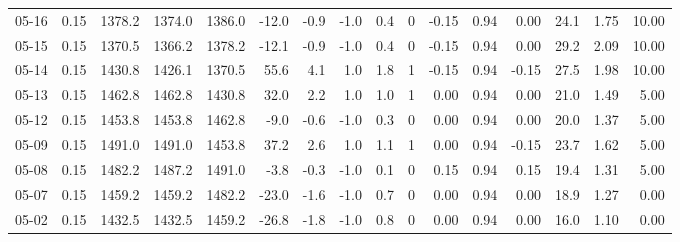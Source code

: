 \begin{threeparttable}
{\begin{tabular}{lrrrrrrrrrrrrrrr}
  05-16 &     0.15 & 1378.2 & 1374.0 & 1386.0 &      -12.0 &           -0.9 &                     -1.0 &                 0.4 &              0 &      -0.15 &      0.94 &           0.00 &             24.1 &            1.75 &                  10.00 \\
  05-15 &     0.15 & 1370.5 & 1366.2 & 1378.2 &      -12.1 &           -0.9 &                     -1.0 &                 0.4 &              0 &      -0.15 &      0.94 &           0.00 &             29.2 &            2.09 &                  10.00 \\
  05-14 &     0.15 & 1430.8 & 1426.1 & 1370.5 &       55.6 &            4.1 &                      1.0 &                 1.8 &              1 &      -0.15 &      0.94 &          -0.15 &             27.5 &            1.98 &                  10.00 \\
  05-13 &     0.15 & 1462.8 & 1462.8 & 1430.8 &       32.0 &            2.2 &                      1.0 &                 1.0 &              1 &       0.00 &      0.94 &           0.00 &             21.0 &            1.49 &                   5.00 \\
  05-12 &     0.15 & 1453.8 & 1453.8 & 1462.8 &       -9.0 &           -0.6 &                     -1.0 &                 0.3 &              0 &       0.00 &      0.94 &           0.00 &             20.0 &            1.37 &                   5.00 \\
  05-09 &     0.15 & 1491.0 & 1491.0 & 1453.8 &       37.2 &            2.6 &                      1.0 &                 1.1 &              1 &       0.00 &      0.94 &          -0.15 &             23.7 &            1.62 &                   5.00 \\
  05-08 &     0.15 & 1482.2 & 1487.2 & 1491.0 &       -3.8 &           -0.3 &                     -1.0 &                 0.1 &              0 &       0.15 &      0.94 &           0.15 &             19.4 &            1.31 &                   5.00 \\
  05-07 &     0.15 & 1459.2 & 1459.2 & 1482.2 &      -23.0 &           -1.6 &                     -1.0 &                 0.7 &              0 &       0.00 &      0.94 &           0.00 &             18.9 &            1.27 &                   0.00 \\
  05-02 &     0.15 & 1432.5 & 1432.5 & 1459.2 &      -26.8 &           -1.8 &                     -1.0 &                 0.8 &              0 &       0.00 &      0.94 &           0.00 &             16.0 &            1.10 &                   0.00 \\

\end{tabular}}
\end{threeparttable}
